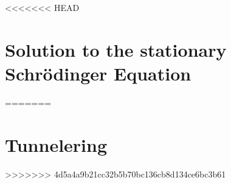 <<<<<<< HEAD
\section{Solution to the stationary Schrödinger Equation}
=======
\section{Tunnelering}
>>>>>>> 4d5a4a9b21cc32b5b70bc136cb8d134ce6bc3b61
